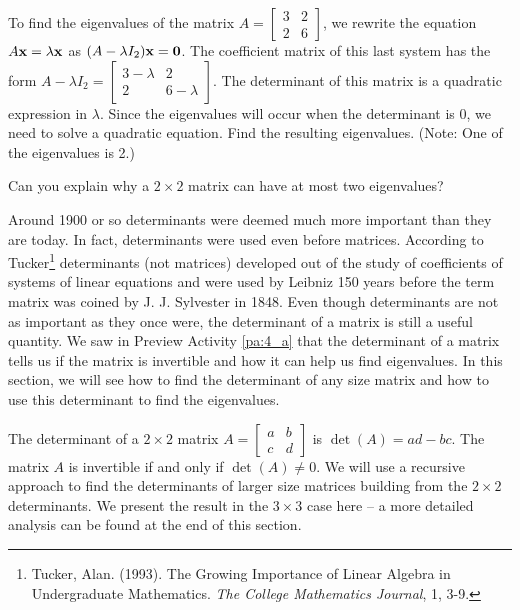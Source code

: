 \begin{pa}
\item To find the eigenvalues of the matrix $A=\left[ \begin{array}{cc} 3&2\\2&6 \end{array} \right]$, we rewrite the equation $A \mathbf{x} = \lambda \mathbf{x}$ as $(A - \lambda I_2) \mathbf{x} = \mathbf{0}$. The coefficient matrix of this last system has the form $A-\lambda I_2 = \left[ \begin{array}{cc} 3-\lambda &2 \\ 2& 6-\lambda \end{array} \right]$. The determinant of this matrix is a quadratic expression in $\lambda$. Since the eigenvalues will occur when the determinant is 0, we need to solve a quadratic equation. Find the resulting eigenvalues. (Note: One of the eigenvalues is 2.)



\item Can you explain why a $2\times 2$ matrix can have at most two eigenvalues?
	

\ee

\end{pa}



\label{sec:det_square}

Around 1900 or so determinants were deemed much more important than they are today. In fact, determinants were used even before matrices. According to Tucker\footnote{Tucker, Alan. (1993). The Growing Importance of Linear Algebra in Undergraduate Mathematics. \emph{The College Mathematics Journal}, 1, 3-9.} determinants (not matrices) developed out of the study of coefficients of systems of linear equations and were used by Leibniz 150 years before the term matrix was coined by J. J. Sylvester in 1848. Even though determinants are not as important as they once were, the determinant of a matrix is still a useful quantity. We saw in Preview Activity \ref{pa:4_a} that the determinant of a matrix tells us if the matrix is invertible and how it can help us find eigenvalues. In this section, we will see how to find the determinant of any size matrix and how to use this determinant to find the eigenvalues.

The determinant of a $2 \times 2$ matrix $A = \left[ \begin{array}{cc} a&b \\ c&d \end{array} \right]$ is $\det(A)=ad-bc$. The matrix $A$ is invertible if and only if $\det(A) \neq 0$. We will use a recursive approach to find the determinants of larger size matrices building from the $2\times 2$ determinants. We present the result in the $3 \times 3$ case here -- a more detailed analysis can be found at the end of this section. 

